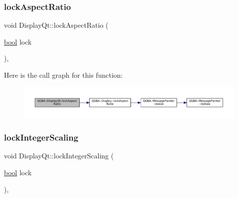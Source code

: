 \subsubsection{\texorpdfstring{lock\+Aspect\+Ratio}{lockAspectRatio}}
{\footnotesize\ttfamily void Display\+Qt\+::lock\+Aspect\+Ratio (\begin{DoxyParamCaption}\item[{\mbox{\hyperlink{libretro_8h_a4a26dcae73fb7e1528214a068aca317e}{bool}}}]{lock }\end{DoxyParamCaption})\hspace{0.3cm}{\ttfamily [override]}, {\ttfamily [slot]}}

Here is the call graph for this function\+:
\nopagebreak
\begin{figure}[H]
\begin{center}
\leavevmode
\includegraphics[width=350pt]{class_q_g_b_a_1_1_display_qt_a21bdc1c0c76369848e567083f930ee4a_cgraph}
\end{center}
\end{figure}
\mbox{\label{class_q_g_b_a_1_1_display_qt_afc071d5977e2451415f2f47689cdd350}} 
\subsubsection{\texorpdfstring{lock\+Integer\+Scaling}{lockIntegerScaling}}
{\footnotesize\ttfamily void Display\+Qt\+::lock\+Integer\+Scaling (\begin{DoxyParamCaption}\item[{\mbox{\hyperlink{libretro_8h_a4a26dcae73fb7e1528214a068aca317e}{bool}}}]{lock }\end{DoxyParamCaption})\hspace{0.3cm}{\ttfamily [override]}, {\ttfamily [slot]}}

